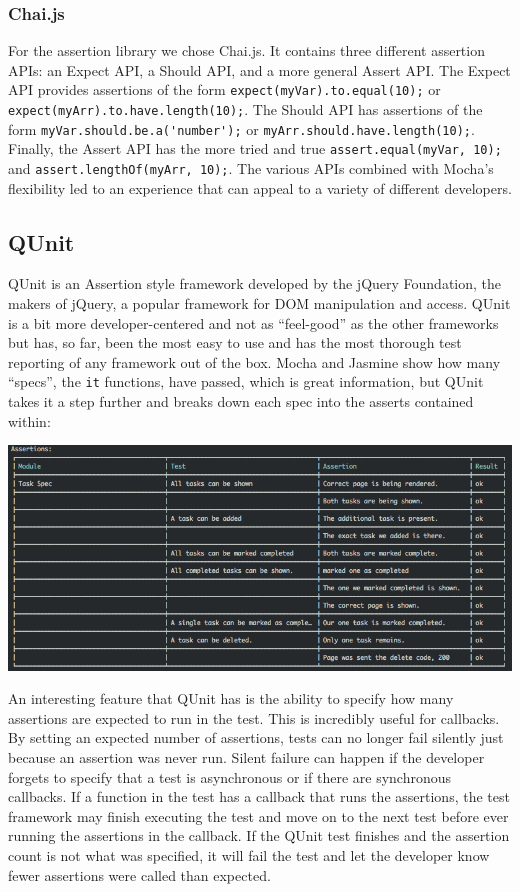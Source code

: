 \documentclass[12pt]{ucthesis}
\newenvironment{Figure}
  {\par\medskip\noindent\minipage{\linewidth}}
  {\endminipage\par\medskip}
\begin{document}
\subsubsection{Chai.js}
For the assertion library we chose Chai.js\cite{Chaijs}. It contains three different assertion APIs: an Expect API, a Should API, and a more general Assert API. The Expect API provides assertions of the form \lstinline{expect(myVar).to.equal(10);} or \lstinline{expect(myArr).to.have.length(10);}. The Should API has assertions of the form \lstinline{myVar.should.be.a('number');} or \lstinline{myArr.should.have.length(10);}. Finally, the Assert API has the more tried and true \lstinline{assert.equal(myVar, 10);} and \lstinline{assert.lengthOf(myArr, 10);}. The various APIs combined with Mocha's flexibility led to an experience that can appeal to a variety of different developers.

\subsection{QUnit}
QUnit\cite{QUnit} is an Assertion style framework developed by the jQuery Foundation, the makers of jQuery, a popular framework for DOM manipulation and access\cite{jQuery}. QUnit is a bit more developer-centered and not as ``feel-good'' as the other frameworks but has, so far, been the most easy to use and has the most thorough test reporting of any framework out of the box. Mocha and Jasmine show how many ``specs'', the \lstinline{it} functions, have passed, which is great information, but QUnit takes it a step further and breaks down each spec into the asserts contained within:
\begin{Figure}
  \centering
  \includegraphics[width=\linewidth]{qunitrunner.png}
\end{Figure}

An interesting feature that QUnit has is the ability to specify how many assertions are expected to run in the test. This is incredibly useful for callbacks. By setting an expected number of assertions, tests can no longer fail silently just because an assertion was never run. Silent failure can happen if the developer forgets to specify that a test is asynchronous or if there are synchronous callbacks. If a function in the test has a callback that runs the assertions, the test framework may finish executing the test and move on to the next test before ever running the assertions in the callback. If the QUnit test finishes and the assertion count is not what was specified, it will fail the test and let the developer know fewer assertions were called than expected.
\end{document}
